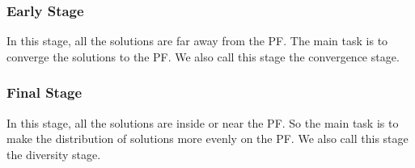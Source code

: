 \documentclass[conference]{IEEEtran}
\begin{document}
\subsubsection{Early Stage} In this stage, 
all the solutions are far away from the PF.
The main task is to converge the solutions to the PF.
We also call this stage the convergence stage.
\subsubsection{Final Stage} In this stage,
all the solutions are inside or near the PF. 
So the main task is to make the distribution of solutions more evenly on the PF.
We also call this stage the diversity stage.

%
% 
\end{document}
